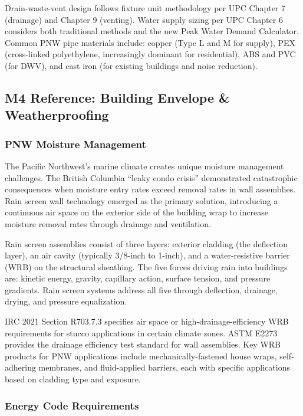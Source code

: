 \documentclass[11pt,letterpaper]{article}
\begin{document}
Drain-waste-vent design follows fixture unit methodology per UPC Chapter 7 (drainage) and Chapter 9 (venting). Water supply sizing per UPC Chapter 6 considers both traditional methods and the new Peak Water Demand Calculator. Common PNW pipe materials include: copper (Type L and M for supply), PEX (cross-linked polyethylene, increasingly dominant for residential), ABS and PVC (for DWV), and cast iron (for existing buildings and noise reduction).

\subsection{M4 Reference: Building Envelope \& Weatherproofing}

\subsubsection{PNW Moisture Management}

The Pacific Northwest's marine climate creates unique moisture management challenges. The British Columbia ``leaky condo crisis'' demonstrated catastrophic consequences when moisture entry rates exceed removal rates in wall assemblies. Rain screen wall technology emerged as the primary solution, introducing a continuous air space on the exterior side of the building wrap to increase moisture removal rates through drainage and ventilation.

Rain screen assemblies consist of three layers: exterior cladding (the deflection layer), an air cavity (typically 3/8-inch to 1-inch), and a water-resistive barrier (WRB) on the structural sheathing. The five forces driving rain into buildings are: kinetic energy, gravity, capillary action, surface tension, and pressure gradients. Rain screen systems address all five through deflection, drainage, drying, and pressure equalization.

IRC 2021 Section R703.7.3 specifies air space or high-drainage-efficiency WRB requirements for stucco applications in certain climate zones. ASTM E2273 provides the drainage efficiency test standard for wall assemblies. Key WRB products for PNW applications include mechanically-fastened house wraps, self-adhering membranes, and fluid-applied barriers, each with specific applications based on cladding type and exposure.

\subsubsection{Energy Code Requirements}
\end{document}
